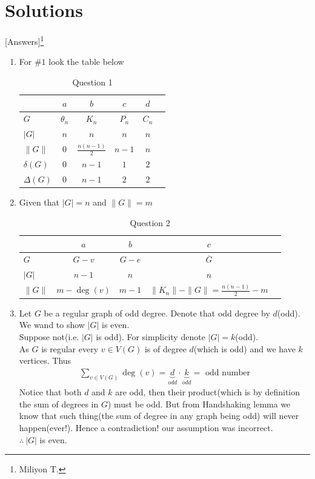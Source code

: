 \documentclass[paper=a4, fontsize=11pt,twoside]{scrartcl}		%
\theoremstyle{definition}
\theoremstyle{remark}
\begin{document}
\section{Solutions}[Answers]\footnote[$\ddag$]{Miliyon T.}
\begin{enumerate}
  \item For $\#1$ look the table below

  \begin{table}[!htb]
\centering
\begin{tabular}{ l | c|c|c|c| r | }
                 & $a$         & $b$                & $c$   & $d$   \\ \hline
    $G$          & $\theta_n$  & $K_n$              & $P_n$ & $C_n$ \\ \hline
    $|G|$        & $n$         & $n$                & $n$   & $n$  \\ \hline
    $\|G\|$      & $0$         & $\frac{n(n-1)}{2}$ & $n-1$ & $n$  \\ \hline
    $\delta(G)$  & $0$         & $n-1$              & $1$   & $2$  \\ \hline
    $\Delta(G)$  & $0$         & $n-1$              & $2$   & $2$  \\
    \hline
  \end{tabular}
  \caption{Question 1}
\end{table}
  \item Given that $|G|=n$ and $\|G\|=m$

  \begin{table}[!htb]
\centering
\begin{tabular}{ l|c|c|c|r |}
               & $a$         & $b$     &  $c$ \\ \hline
    $G$        & $G-v$       & $G-e$   & $\overline{G}$   \\ \hline
    $|G|$      & $n-1$       & $n$     & $n$ \\ \hline
    $\|G\|$    & $m-\deg(v)$ & $m-1$   & $\|K_n\|-\|G\|=\frac{n(n-1)}{2}-m$   \\
    \hline
  \end{tabular}
  \caption{Question 2}
\end{table}

  \item Let $G$ be a regular graph of odd degree. Denote that odd degree by $d$(odd). We wand to show $|G|$ is even.\\
      Suppose not(i.e. $|G|$ is odd). For simplicity denote $|G|=k$(odd).\\
      As $G$ is regular every $v\in V(G)$ is of degree $d$(which is odd) and we have $k$ vertices. Thus
      \begin{align*}
      \sum_{v\in V(G)}\deg(v)=\underbrace{d}_{odd}\cdot\underbrace{k}_{odd}=\text{ odd number}
      \end{align*}
  Notice that both $d$ and $k$ are odd, then their product(which is by definition the sum of degrees in $G$) must be odd. But from Handshaking lemma we know that such thing(the sum of degree in any graph being odd) will never happen(ever!). Hence a contradiction! our assumption was incorrect.\\
  $\therefore\ |G|$ is even.


\end{enumerate}
\end{document}
